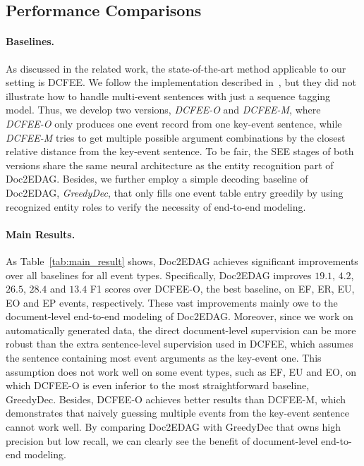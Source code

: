 \documentclass[11pt,a4paper]{article}
\begin{document}
\subsection{Performance Comparisons}
\paragraph{Baselines.}
As discussed in the related work, the state-of-the-art method applicable to our setting is DCFEE.
We follow the implementation described in~\cite{yang2018dcfee},
but they did not illustrate how to handle multi-event sentences with just a sequence tagging model.
Thus, we develop two versions, \textit{DCFEE-O} and \textit{DCFEE-M},
where \textit{DCFEE-O} only produces one event record from one key-event sentence,
while \textit{DCFEE-M} tries to get multiple possible argument combinations by the closest relative distance from the key-event sentence.
To be fair, the SEE stages of both versions share the same neural architecture as the entity recognition part of Doc2EDAG.
Besides, we further employ a simple decoding baseline of Doc2EDAG, \textit{GreedyDec},
that only fills one event table entry greedily by using recognized entity roles to verify the necessity of end-to-end modeling.

\paragraph{Main Results.}
As Table~\ref{tab:main_result} shows, Doc2EDAG achieves significant improvements over all baselines for all event types.
Specifically, Doc2EDAG improves $19.1$, $4.2$, $26.5$, $28.4$ and $13.4$ F1 scores over DCFEE-O, the best baseline, on EF, ER, EU, EO and EP events, respectively.
These vast improvements mainly owe to the document-level end-to-end modeling of Doc2EDAG.
Moreover, since we work on automatically generated data,
the direct document-level supervision can be more robust than the extra sentence-level supervision used in DCFEE,
which assumes the sentence containing most event arguments as the key-event one.
This assumption does not work well on some event types,
such as EF, EU and EO,
on which DCFEE-O is even inferior to the most straightforward baseline, GreedyDec.
Besides, DCFEE-O achieves better results than DCFEE-M, which demonstrates that naively guessing multiple events from the key-event sentence cannot work well.
By comparing Doc2EDAG with GreedyDec that owns high precision but low recall,
we can clearly see the benefit of document-level end-to-end modeling.
\end{document}
